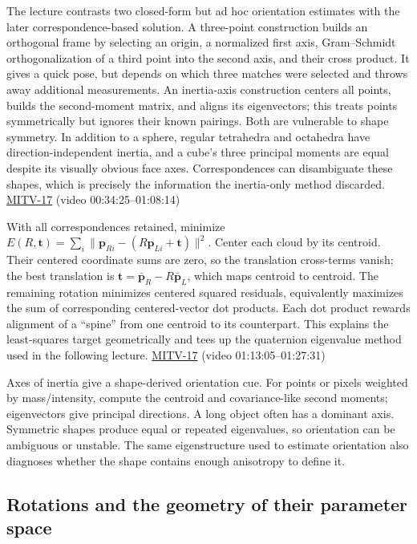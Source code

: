 The lecture contrasts two closed-form but ad hoc orientation estimates with the later correspondence-based solution. A three-point construction builds an orthogonal frame by selecting an origin, a normalized first axis, Gram--Schmidt orthogonalization of a third point into the second axis, and their cross product. It gives a quick pose, but depends on which three matches were selected and throws away additional measurements. An inertia-axis construction centers all points, builds the second-moment matrix, and aligns its eigenvectors; this treats points symmetrically but ignores their known pairings. Both are vulnerable to shape symmetry. In addition to a sphere, regular tetrahedra and octahedra have direction-independent inertia, and a cube's three principal moments are equal despite its visually obvious face axes. Correspondences can disambiguate these shapes, which is precisely the information the inertia-only method discarded. \hyperref[04-visual-computing-ii-ch036-mitv-17---photogrammetry-orientation-axes-of-inertia-symmetry-orientation]{MITV-17} (video 00:34:25--01:08:14)

With all correspondences retained, minimize \(E(R,\mathbf{t})=\sum_i\|\mathbf{p}_{Ri}-(R\mathbf{p}_{Li}+\mathbf{t})\|^2\). Center each cloud by its centroid. Their centered coordinate sums are zero, so the translation cross-terms vanish; the best translation is \(\mathbf{t}=\bar{\mathbf{p}}_R-R\bar{\mathbf{p}}_L\), which maps centroid to centroid. The remaining rotation minimizes centered squared residuals, equivalently maximizes the sum of corresponding centered-vector dot products. Each dot product rewards alignment of a ``spine'' from one centroid to its counterpart. This explains the least-squares target geometrically and tees up the quaternion eigenvalue method used in the following lecture. \hyperref[04-visual-computing-ii-ch036-mitv-17---photogrammetry-orientation-axes-of-inertia-symmetry-orientation]{MITV-17} (video 01:13:05--01:27:31)

Axes of inertia give a shape-derived orientation cue. For points or pixels weighted by mass/intensity, compute the centroid and covariance-like second moments; eigenvectors give principal directions. A long object often has a dominant axis. Symmetric shapes produce equal or repeated eigenvalues, so orientation can be ambiguous or unstable. The same eigenstructure used to estimate orientation also diagnoses whether the shape contains enough anisotropy to define it.

\subsection{Rotations and the geometry of their parameter space}\label{04-visual-computing-ii-ch032-rotations-and-the-geometry-of-their-parameter-space}

